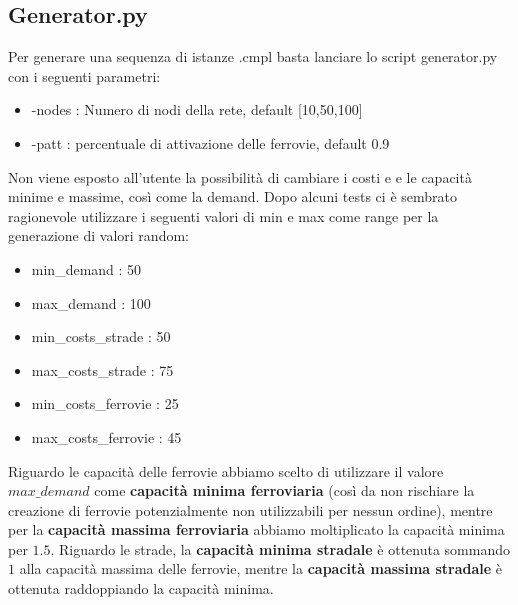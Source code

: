 \documentclass{article}
\begin{document}
\subsection{Generator.py}
Per generare una sequenza di istanze .cmpl basta lanciare lo script generator.py con i seguenti parametri:

\begin{itemize}
    \item -nodes : Numero di nodi della rete, default [10,50,100]
    \item -patt : percentuale di attivazione delle ferrovie, default 0.9
\end{itemize}
Non viene esposto all'utente la possibilità di cambiare i costi e e le capacità minime e massime, così come la demand. Dopo alcuni tests ci è sembrato ragionevole utilizzare i seguenti valori di min e max come range per la generazione di valori random:
\begin{itemize}
    \item min\_demand : 50
    \item max\_demand : 100
    \item min\_costs\_strade : 50
    \item max\_costs\_strade : 75
    \item min\_costs\_ferrovie : 25
    \item max\_costs\_ferrovie : 45
\end{itemize}

Riguardo le capacità delle ferrovie abbiamo scelto di utilizzare il valore $max\_demand$ come \textbf{capacità minima ferroviaria} (così da non rischiare la creazione di ferrovie potenzialmente non utilizzabili per nessun ordine), mentre per la \textbf{capacità massima ferroviaria} abbiamo moltiplicato la capacità minima per $1.5$. Riguardo le strade, la \textbf{capacità minima stradale} è ottenuta sommando $1$ alla capacità massima delle ferrovie, mentre la \textbf{capacità massima stradale} è ottenuta raddoppiando la capacità minima.
\end{document}
